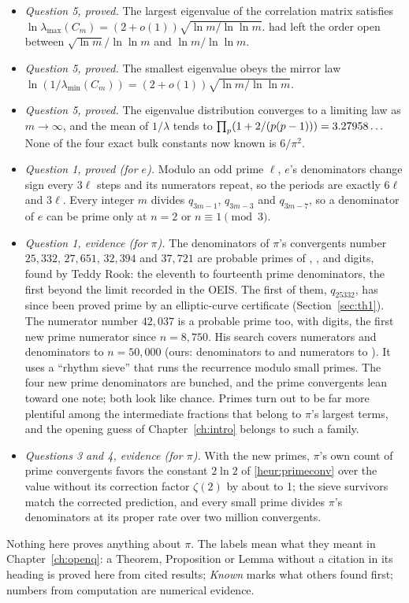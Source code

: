 \begin{itemize}
\item \emph{Question 5, proved.} The largest eigenvalue of the correlation matrix satisfies $\ln\lambda_{\max}(C_m) = (2 + o(1))\sqrt{\ln m/\ln\ln m}$.  had left the order open between $\sqrt{\ln m}/\ln\ln m$ and $\ln m/\ln\ln m$.
\item \emph{Question 5, proved.} The smallest eigenvalue obeys the mirror law $\ln(1/\lambda_{\min}(C_m)) = (2 + o(1))\sqrt{\ln m/\ln\ln m}$.
\item \emph{Question 5, proved.} The eigenvalue distribution converges to a limiting law as $m \to \infty$, and the mean of $1/\lambda$ tends to $\prod_p(1 + 2/(p(p-1))) = 3.27958\ldots$ None of the four exact bulk constants now known is $6/\pi^2$.
\item \emph{Question 1, proved (for $e$).} Modulo an odd prime $\ell$, $e$'s denominators change sign every $3\ell$ steps and its numerators repeat, so the periods are exactly $6\ell$ and $3\ell$. Every integer $m$ divides $q_{3m-1}$, $q_{3m-3}$ and $q_{3m-7}$, so a denominator of $e$ can be prime only at $n = 2$ or $n \equiv 1 \pmod 3$.
\item \emph{Question 1, evidence (for $\pi$).} The denominators of $\pi$'s convergents number $25{,}332$, $27{,}651$, $32{,}394$ and $37{,}721$ are probable primes of \ThDigits, \TwDigits, \TtDigits{} and \FoDigits{} digits, found by Teddy Rook: the eleventh to fourteenth prime denominators, the first beyond the limit recorded in the OEIS. The first of them, $q_{25332}$, has since been proved prime by an elliptic-curve certificate (Section~\ref{sec:th1}). \addedon{\revG} The numerator number $42{,}037$ is a probable prime too, with \FiDigits{} digits, the first new prime numerator since $n = 8{,}750$. His search covers numerators and denominators to $n = 50{,}000$ (ours: denominators to \FiOurQ{} and numerators to \FiOurP). It uses a ``rhythm sieve'' that runs the recurrence modulo small primes. The four new prime denominators are bunched, and the prime convergents lean toward one note; both look like chance. Primes turn out to be far more plentiful among the intermediate fractions that belong to $\pi$'s largest terms, and the opening guess of Chapter~\ref{ch:intro} belongs to such a family.
\item \emph{Questions 3 and 4, evidence (for $\pi$).} With the new primes, $\pi$'s own count of prime convergents favors the constant $2\ln 2$ of \cref{heur:primeconv} over the value without its correction factor $\zeta(2)$ by about \RaFiLR{} to 1; the sieve survivors match the corrected prediction, and every small prime divides $\pi$'s denominators at its proper rate over two million convergents.
\end{itemize}
Nothing here proves anything about $\pi$. The labels mean what they meant in Chapter~\ref{ch:openq}: a Theorem, Proposition or Lemma without a citation in its heading is proved here from cited results; \emph{Known} marks what others found first; numbers from computation are numerical evidence.

